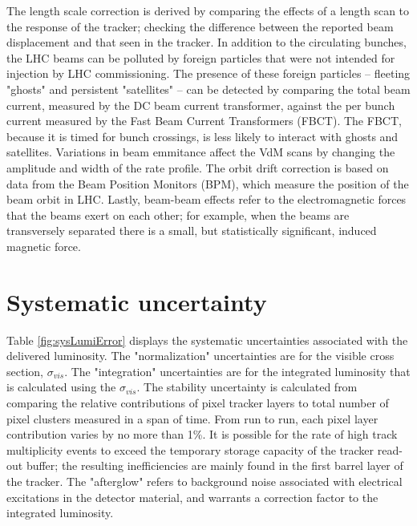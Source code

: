 The length scale correction is derived by comparing the effects of a length scan to the response of the tracker; checking the difference between the reported beam displacement and that seen in the tracker. In addition to the circulating bunches, the LHC beams can be polluted by foreign particles that were not intended for injection by LHC commissioning. The presence of these foreign particles -- fleeting "ghosts" and persistent "satellites" -- can be detected by comparing the total beam current, measured by the DC beam current transformer, against the per bunch current measured by the Fast Beam Current Transformers (FBCT). The FBCT, because it is timed for bunch crossings, is less likely to interact with ghosts and satellites. Variations in beam emmitance affect the VdM scans by changing the amplitude and width of the rate profile. The orbit drift correction is based on data from the Beam Position Monitors (BPM), which measure the position of the beam orbit in LHC. Lastly, beam-beam effects refer to the electromagnetic forces that the beams exert on each other; for example, when the beams are transversely separated there is a small, but statistically significant, induced magnetic force. 

\section{Systematic uncertainty}

Table \ref{fig:sysLumiError} displays the systematic uncertainties associated with the delivered luminosity. The "normalization" uncertainties are for the visible cross section, $\sigma_{vis}$. The "integration" uncertainties are for the integrated luminosity that is calculated using the $\sigma_{vis}$. The stability uncertainty is calculated from comparing the relative contributions of pixel tracker layers to total number of pixel clusters measured in a span of time. From run to run, each pixel layer contribution varies by no more than 1\%. It is possible for the rate of high track multiplicity events to exceed the temporary storage capacity of the tracker read-out buffer; the resulting inefficiencies are mainly found in the first barrel layer of the tracker. The "afterglow" refers to background noise associated with electrical excitations in the detector material, and warrants a correction factor to the integrated luminosity. 

